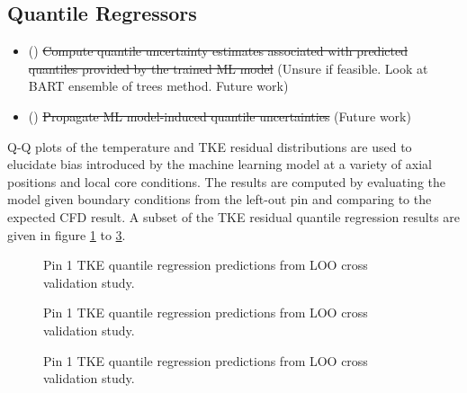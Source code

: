 \subsection{Quantile Regressors}

\begin{itemize}   
    \item (\xmark) \sout{Compute quantile uncertainty estimates associated with predicted quantiles provided by the trained ML model} (Unsure if feasible.  Look at BART ensemble of trees method. Future work)
    \item (\xmark) \sout{Propagate ML model-induced quantile uncertainties} (Future work)
\end{itemize}


Q-Q plots of the  temperature and TKE residual distributions are used to elucidate bias introduced by the machine learning model at a variety of axial positions and local core conditions.  The results are computed by evaluating the model given boundary conditions from the left-out pin and comparing to the expected CFD result.
A subset of the TKE residual quantile regression results are given in figure \ref{fig:tkepin1} to \ref{fig:tkepin3}.

\begin{figure}[H]%
    \centering
    \qquad
    \caption[Q-Q LOO TKE pin 1 results.]{Pin 1 TKE quantile regression predictions from LOO cross validation study.}%
    \label{fig:tkepin1}%
\end{figure}

\begin{figure}[H]%
    \centering
    \qquad
    \caption[Q-Q LOO TKE pin 2 results.]{Pin 1 TKE quantile regression predictions from LOO cross validation study.}%
    \label{fig:tkepin2}%
\end{figure}

\begin{figure}[H]%
    \centering
    \qquad
    \caption[Q-Q LOO TKE pin 3 results.]{Pin 1 TKE quantile regression predictions from LOO cross validation study.}%
    \label{fig:tkepin3}%
\end{figure}


